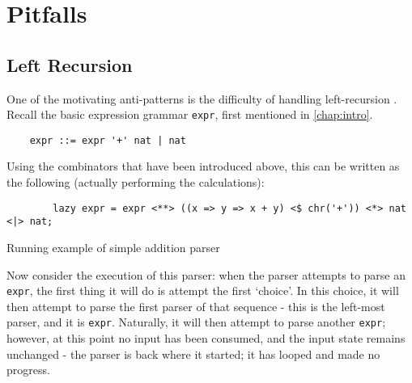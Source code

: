\section{Pitfalls}
\label{sec:pitfalls}

\subsection{Left Recursion}
\label{ssec:lrec}

One of the motivating anti-patterns is the difficulty of handling left-recursion \cite{willis21}.
Recall the basic expression grammar \texttt{expr}, first mentioned in \autoref{chap:intro}.
\begin{lstlisting}
    expr ::= expr '+' nat | nat
\end{lstlisting}
Using the combinators that have been introduced above, this can be written as the following (actually performing the calculations):

\begin{capminted}
    \begin{verbatim}
        lazy expr = expr <**> ((x => y => x + y) <$ chr('+')) <*> nat <|> nat;
    \end{verbatim}
    \vspace{-0.5\baselineskip}
    \caption{Running example of simple addition parser}
    \label{lst:running_example}
\end{capminted}

Now consider the execution of this parser: when the parser attempts to parse an \texttt{expr}, the first thing it will do is attempt the first `choice'.
In this choice, it will then attempt to parse the first parser of that sequence - this is the left-most parser, and it is \texttt{expr}.
Naturally, it will then attempt to parse another \texttt{expr}; however, at this point no input has been consumed, and the input state remains unchanged - the parser is back where it started; it has looped and made no progress.

